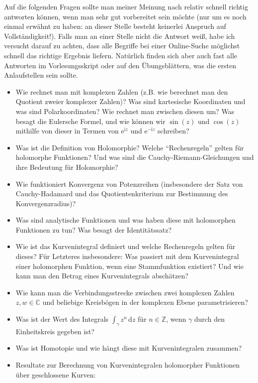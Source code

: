 \documentclass{article}
\theoremstyle{plain}
\theoremstyle{definition}
\begin{document}
Auf die folgenden Fragen sollte man meiner Meinung nach relativ schnell richtig antworten können, wenn man sehr gut vorbereitet sein möchte (nur um es noch einmal erwähnt zu haben: an dieser Stelle besteht keinerlei Anspruch auf Vollständigkeit!).
Falls man an einer Stelle nicht die Antwort weiß, habe ich versucht darauf zu achten, dass alle Begriffe bei einer Online-Suche möglichst schnell das richtige Ergebnis liefern.
Natürlich finden sich aber auch fast alle Antworten im Vorlesungsskript oder auf den Übungsblättern, was die ersten Anlaufstellen sein sollte.
\begin{itemize}
	\item Wie rechnet man mit komplexen Zahlen (z.B. wie berechnet man den Quotient zweier komplexer Zahlen)?
	      Was sind kartesische Koordinaten und was sind Polarkoordinaten?
	      Wie rechnet man zwischen diesen um?
	      Was besagt die Eulersche Formel, und wie können wir $\sin(z)$ und $\cos(z)$ mithilfe von dieser in Termen von $\mathrm{e}^{\mathrm{i} z}$ und $\mathrm{e}^{-\mathrm{i} z}$ schreiben?
	\item Was ist die Definition von Holomorphie?
	      Welche \enquote{Rechenregeln} gelten für holomorphe Funktionen?
	      Und was sind die Cauchy-Riemann-Gleichungen und ihre Bedeutung für Holomorphie?
	\item Wie funktioniert Konvergenz von Potenzreihen (insbesondere der Satz von Cauchy-Hadamard und das Quotientenkriterium zur Bestimmung des Konvergenzradius)?
	\item Was sind analytische Funktionen und was haben diese mit holomorphen Funktionen zu tun?
	      Was besagt der Identitätssatz?
	\item Wie ist das Kurvenintegral definiert und welche Rechenregeln gelten für dieses?
	      Für Letzteres insbesondere:
	      Was passiert mit dem Kurvenintegral einer holomorphen Funktion, wenn eine Stammfunktion existiert?
	      Und wie kann man den Betrag eines Kurvenintegrals abschätzen?
	\item Wie kann man die Verbindungsstrecke zwischen zwei komplexen Zahlen $z, w \in \mathbb{C}$ und beliebige Kreisbögen in der komplexen Ebene parametrisieren?
	\item Was ist der Wert des Integrals $\int_{\gamma} z^n \,\mathrm{d}z$ für $n \in \mathbb{Z}$, wenn $\gamma$ durch den Einheitskreis gegeben ist?
	\item Was ist Homotopie und wie hängt diese mit Kurvenintegralen zusammen?
	\item Resultate zur Berechnung von Kurvenintegralen holomorpher Funktionen über geschlossene Kurven:

\end{itemize}
\end{document}
